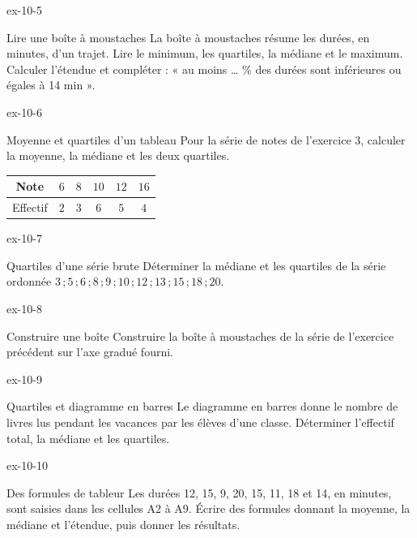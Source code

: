 \begin{blocLivre}{ex-10-5}\begin{exercice}[1]{Lire une boîte à moustaches}
La boîte à moustaches résume les durées, en minutes, d’un trajet. Lire le minimum, les quartiles, la médiane et le maximum. Calculer l’étendue et compléter : « au moins … \% des durées sont inférieures ou égales à 14 min ».
\label{fig-ex-10-5}
\end{exercice}\end{blocLivre}

\clearpage{}
\begin{blocLivre}{ex-10-6}\begin{exercice}[2]{Moyenne et quartiles d’un tableau}
Pour la série de notes de l’exercice 3, calculer la moyenne, la médiane et les deux quartiles.\begin{center}\renewcommand{\arraystretch}{1.35}\begin{tabular}{c|ccccc}\toprule
Note & $6$ & $8$ & $10$ & $12$ & $16$\\\midrule
Effectif & $2$ & $3$ & $6$ & $5$ & $4$\\
\bottomrule\end{tabular}\end{center}
\end{exercice}\end{blocLivre}
\begin{blocLivre}{ex-10-7}\begin{exercice}[2]{Quartiles d’une série brute}
Déterminer la médiane et les quartiles de la série ordonnée $3\,;5\,;6\,;8\,;9\,;10\,;12\,;13\,;15\,;18\,;20$.
\end{exercice}\end{blocLivre}
\begin{blocLivre}{ex-10-8}\begin{exercice}[2]{Construire une boîte}
Construire la boîte à moustaches de la série de l’exercice précédent sur l’axe gradué fourni.
\label{fig-ex-10-8}
\end{exercice}\end{blocLivre}
\begin{blocLivre}{ex-10-9}\begin{exercice}[2]{Quartiles et diagramme en barres}
Le diagramme en barres donne le nombre de livres lus pendant les vacances par les élèves d’une classe. Déterminer l’effectif total, la médiane et les quartiles.
\label{fig-ex-10-9}
\end{exercice}\end{blocLivre}
\begin{blocLivre}{ex-10-10}\begin{exercice}[2]{Des formules de tableur}
Les durées 12, 15, 9, 20, 15, 11, 18 et 14, en minutes, sont saisies dans les cellules A2 à A9. Écrire des formules donnant la moyenne, la médiane et l’étendue, puis donner les résultats.
\end{exercice}\end{blocLivre}

